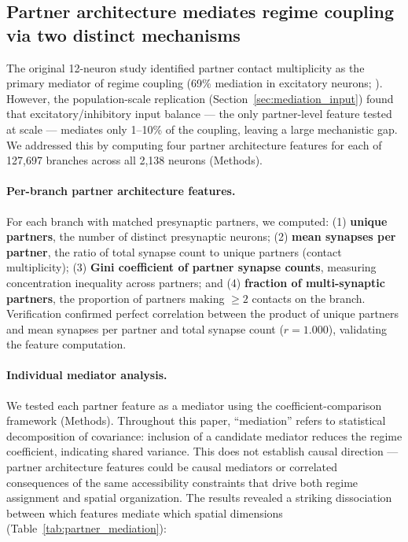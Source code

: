 \documentclass[11pt]{article}
\begin{document}
\subsection{Partner architecture mediates regime coupling via two distinct mechanisms}
\label{sec:partner_architecture}

The original 12-neuron study identified partner contact multiplicity as the primary mediator of regime coupling (69\% mediation in excitatory neurons; \citealt{voruganti2026coupling}). However, the population-scale replication (Section~\ref{sec:mediation_input}) found that excitatory/inhibitory input balance --- the only partner-level feature tested at scale --- mediates only 1--10\% of the coupling, leaving a large mechanistic gap. We addressed this by computing four partner architecture features for each of 127,697 branches across all 2,138 neurons (Methods).

\paragraph{Per-branch partner architecture features.} For each branch with matched presynaptic partners, we computed: (1) \textbf{unique partners}, the number of distinct presynaptic neurons; (2) \textbf{mean synapses per partner}, the ratio of total synapse count to unique partners (contact multiplicity); (3) \textbf{Gini coefficient of partner synapse counts}, measuring concentration inequality across partners; and (4) \textbf{fraction of multi-synaptic partners}, the proportion of partners making $\geq 2$ contacts on the branch. Verification confirmed perfect correlation between the product of unique partners and mean synapses per partner and total synapse count ($r = 1.000$), validating the feature computation.

\paragraph{Individual mediator analysis.} We tested each partner feature as a mediator using the coefficient-comparison framework (Methods). Throughout this paper, ``mediation'' refers to statistical decomposition of covariance: inclusion of a candidate mediator reduces the regime coefficient, indicating shared variance. This does not establish causal direction --- partner architecture features could be causal mediators or correlated consequences of the same accessibility constraints that drive both regime assignment and spatial organization. The results revealed a striking dissociation between which features mediate which spatial dimensions (Table~\ref{tab:partner_mediation}):
\end{document}
